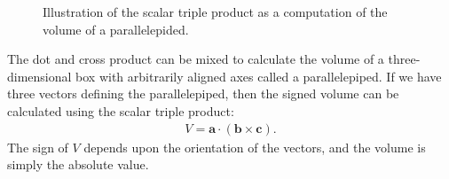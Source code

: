 \begin{figure}[tb!]
\begin{center}
\caption{Illustration of the scalar triple product as a computation of the volume of a parallelepided.}
\label{Fig:linearAlgebra_scalarTripleProduct_volumeParallelepided}
\end{center}
\end{figure}

The dot and cross product can be mixed to calculate the volume of a three-dimensional box with arbitrarily aligned axes called a parallelepiped. If we have three vectors defining the parallelepiped, then the signed volume can be calculated using the scalar triple product:
\begin{align}
  V = \mathbf{a} \cdot ( \mathbf{b} \times \mathbf{c} ) .
\end{align}
The sign of $V$ depends upon the orientation of the vectors, and the volume is simply the absolute value.


